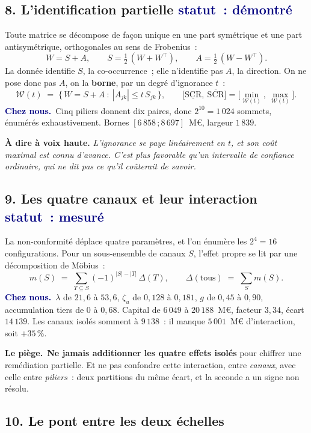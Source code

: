 \documentclass[11pt,a4paper]{article}
\newcommand{\cheznous}[1]{\smallskip\noindent\textcolor{navy}{\textbf{Chez nous.}}\ #1\par}
\newcommand{\lepiege}[1]{\smallskip\noindent\textcolor{accent}{\textbf{Le piège.}}\ #1\par}
\newcommand{\laphrase}[1]{\begin{phrasebox}\textbf{À dire à voix haute.} \emph{#1}\end{phrasebox}}
\begin{document}
\subsection*{8. L'identification partielle \quad\small\textcolor{navy}{statut~: démontré}\normalsize}

Toute matrice se décompose de façon unique en une part symétrique et une part antisymétrique,
orthogonales au sens de Frobenius~:
\[
W = S + A, \qquad S=\tfrac12\,(W+W^{\!\top}), \qquad A=\tfrac12\,(W-W^{\!\top}).
\]
\noindent La donnée identifie $S$, la co-occurrence~; elle n'identifie pas $A$, la direction. On
ne pose donc pas $A$, on la \textbf{borne}, par un degré d'ignorance $t$~:
\[
\mathcal{W}(t) \;=\; \bigl\{\,W=S+A \ :\ |A_{jk}| \le t\,S_{jk}\,\bigr\},
\qquad
\bigl[\underline{\mathrm{SCR}},\ \overline{\mathrm{SCR}}\bigr]
= \bigl[\min_{\mathcal{W}(t)}, \ \max_{\mathcal{W}(t)}\bigr].
\]
\cheznous{Cinq piliers donnent dix paires, donc $2^{10}=1\,024$ sommets, énumérés
exhaustivement. Bornes $[6\,858\,;8\,697]$~M\euro, largeur $1\,839$.}
\laphrase{L'ignorance se paye linéairement en $t$, et son coût maximal est connu d'avance. C'est
plus favorable qu'un intervalle de confiance ordinaire, qui ne dit pas ce qu'il coûterait de
savoir.}

\subsection*{9. Les quatre canaux et leur interaction \quad\small\textcolor{navy}{statut~: mesuré}\normalsize}

La non-conformité déplace quatre paramètres, et l'on énumère les $2^4=16$ configurations. Pour un
sous-ensemble de canaux $S$, l'effet propre se lit par une décomposition de Möbius~:
\[
m(S) \;=\; \sum_{T\subseteq S} (-1)^{|S|-|T|}\,\Delta(T),
\qquad
\Delta(\text{tous}) \;=\; \sum_{S} m(S) .
\]
\cheznous{$\lambda$ de $21{,}6$ à $53{,}6$, $\zeta_u$ de $0{,}128$ à $0{,}181$, $g$ de $0{,}45$ à
$0{,}90$, accumulation tiers de $0$ à $0{,}68$. Capital de $6\,049$ à $20\,188$~M\euro, facteur
$3{,}34$, écart $14\,139$. Les canaux isolés somment à $9\,138$~: il manque $5\,001$~M\euro{}
d'interaction, soit $+35\,\%$.}
\lepiege{\textbf{Ne jamais additionner les quatre effets isolés} pour chiffrer une remédiation
partielle. Et ne pas confondre cette interaction, entre \emph{canaux}, avec celle entre
\emph{piliers}~: deux partitions du même écart, et la seconde a un signe non résolu.}

\subsection*{10. Le pont entre les deux échelles}
\end{document}
